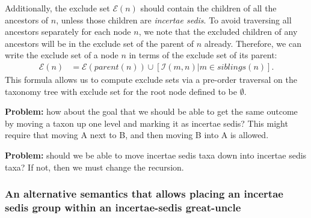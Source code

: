 \documentclass[english]{article}
\begin{document}
Additionally, the exclude set $\mathcal{E}(n)$ should contain the children of
all the ancestors of $n$, unless those children are \emph{incertae sedis}.
To avoid traversing all ancestors separately for each node $n$, we note that the
excluded children of any ancestors will be in the exclude set of the parent of
$n$ already. Therefore, we can write the exclude set of a node $n$ in terms of
the exclude set of its parent:
\begin{align}
    \mathcal{E}(n) & = \mathcal{E}(parent(n))\cup\left[\mathcal{I}(m,n)\big|m\in
           siblings(n)\right].\label{eq:exclude-set-formula-1}
\end{align}
This formula allows us to compute exclude sets via a pre-order traversal on the
taxonomy tree with exclude set for the root node defined to be $\emptyset$.

\textbf{Problem:} how about the goal that we should be able to get the
same outcome by moving a taxon up one level and marking it as incertae
sedis? This might require that moving A next to B, and then moving B
into A is allowed.

\textbf{Problem:} should we be able to move incertae sedis taxa down
into incertae sedis taxa? If not, then we must change the recursion.

\subsubsection{An alternative semantics that allows placing an incertae sedis group within an incertae-sedis great-uncle}

\end{document}
